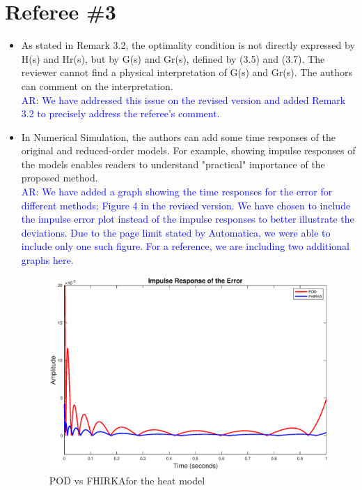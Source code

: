 \documentclass[11pt]{article}
\newcommand{\FH}{FHIRKA}
\def\serkan#1{\textcolor{blue}{{#1}}}
\begin{document}
\section*{Referee \#3}

\begin{itemize}
\item As stated in Remark 3.2, the optimality condition is not directly
expressed by H(s) and Hr(s), but by G(s) and Gr(s), defined by (3.5)
and (3.7).  The reviewer cannot find a physical interpretation of G(s)
and Gr(s).  The authors can comment on the interpretation.\\[1ex]
\serkan{\textsf{AR}:   We have addressed this issue on the revised version  and added Remark 3.2 to precisely address the referee's comment.}

\item In Numerical Simulation, the authors can add some time responses of
the original and reduced-order models.	For example, showing impulse
responses of the models enables readers to understand "practical"
importance of the proposed method.\\[1ex]
\serkan{\textsf{AR}:  We have added a graph showing the time responses for the error for different methods; Figure 4 in the revised version. We have chosen to include the impulse error plot instead of the impulse responses to better illustrate the deviations.  Due to the page limit stated by Automatica, we were able to include only one such figure. For a reference, we are including  two additional graphs here.}
 \begin{figure}[H]
 \centering
   \includegraphics [scale=0.5]{absHeatErrorYlim}
      \caption{POD vs \FH for the heat model\label{fig:impulseHeat}}

\end{figure}
\end{itemize}
\end{document}
